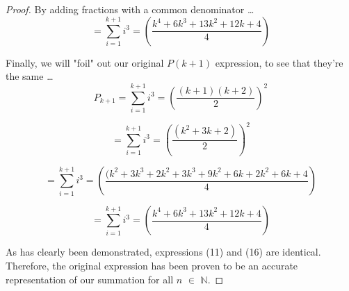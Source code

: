 \documentclass[12pt]{article}
\begin{document}
\begin{proof}
By adding fractions with a common denominator \ldots \\

\begin{equation}
= \sum_{i = 1}^{k + 1} i^{3} = \left(\frac{k^4 + 6k^3 + 13k^2 + 12k + 4}{4}\right)
\end{equation}
\bigskip

Finally, we will "foil" out our original $P(k + 1)$ expression, to see that they're the same  \ldots \\

\begin{equation}
P_{k + 1} = \sum_{i = 1}^{k + 1} i^{3} = \left(\frac{(k + 1)(k + 2)}{2}\right)^2 
\end{equation}
\bigskip

\begin{equation}
= \sum_{i = 1}^{k + 1} i^{3} = \left(\frac{(k^2 + 3k + 2)}{2}\right)^2 
\end{equation}
\bigskip

\begin{equation}
= \sum_{i = 1}^{k + 1} i^{3} = \left(\frac{(k^2 + 3k^3 + 2k^2 + 3k^3 + 9k^2 + 6k + 2k^2 + 6k + 4}{4}\right)
\end{equation}
\bigskip

\begin{equation}
= \sum_{i = 1}^{k + 1} i^{3} = \left(\frac{k^4 + 6k^3 + 13k^2 + 12k + 4}{4}\right)
\end{equation}
\bigskip

As has clearly been demonstrated, expressions (11) and (16) are identical. Therefore, the original expression has been proven to be an accurate representation of our summation for all $n$ $\in$ $\mathbb{N}$.

\end{proof}
\end{document}
